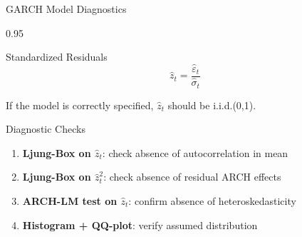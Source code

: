 \documentclass[9pt, aspectratio=169, t]{beamer}
\begin{document}
\begin{frame}{GARCH Model Diagnostics}
    \begin{cminipage}{0.95\textwidth}
    \small
    \begin{block}{Standardized Residuals}
        \[
            \hat{z}_t = \frac{\hat{\varepsilon}_t}{\hat{\sigma}_t}
        \]

        If the model is correctly specified, $\hat{z}_t$ should be i.i.d.(0,1).
    \end{block}

    \vspace{0.3cm}

    \begin{block}{Diagnostic Checks}
        \begin{enumerate}\setlength{\itemsep}{0pt}
            \item \textbf{Ljung-Box on $\hat{z}_t$}: check absence of autocorrelation in mean
            \item \textbf{Ljung-Box on $\hat{z}_t^2$}: check absence of residual ARCH effects
            \item \textbf{ARCH-LM test on $\hat{z}_t$}: confirm absence of heteroskedasticity
            \item \textbf{Histogram + QQ-plot}: verify assumed distribution
        \end{enumerate}
    \end{block}
    \end{cminipage}
\end{frame}
\end{document}
